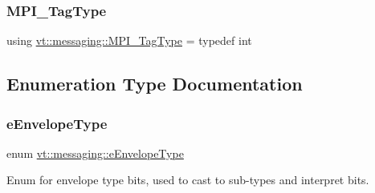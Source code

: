 \mbox{\label{namespacevt_1_1messaging_af700cb74b7b97c1a305267a9eb3ba91a}} 
\subsubsection{\texorpdfstring{M\+P\+I\+\_\+\+Tag\+Type}{MPI\_TagType}}
{\footnotesize\ttfamily using \hyperlink{namespacevt_1_1messaging_af700cb74b7b97c1a305267a9eb3ba91a}{vt\+::messaging\+::\+M\+P\+I\+\_\+\+Tag\+Type} = typedef int}



\subsection{Enumeration Type Documentation}
\mbox{\label{namespacevt_1_1messaging_a6508ef3a4701a2e6fd0bfe3edcc63a6c}} 
\subsubsection{\texorpdfstring{e\+Envelope\+Type}{eEnvelopeType}}
{\footnotesize\ttfamily enum \hyperlink{namespacevt_1_1messaging_a6508ef3a4701a2e6fd0bfe3edcc63a6c}{vt\+::messaging\+::e\+Envelope\+Type}}



Enum for envelope type bits, used to cast to sub-\/types and interpret bits. 


